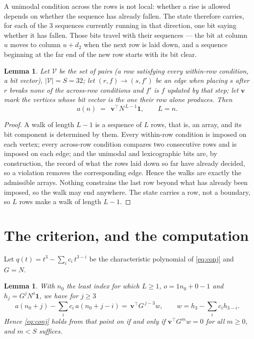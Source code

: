 \documentclass[11pt,a4paper]{article}
\theoremstyle{plain}
\newtheorem{lemma}[theorem]{Lemma}
\theoremstyle{definition}
\begin{document}
A unimodal condition across the rows is not local: whether a
rise is allowed depends on whether the sequence has already fallen. The state therefore
carries, for each of the $3$ sequences currently running in that direction, one bit saying
whether it has fallen. Those bits travel with their sequences --- the bit at column $u$
moves to column $u+d_2$ when the next row is laid down, and a sequence beginning at the
far end of the new row starts with its bit clear.

\begin{lemma}\label{lem:walk}
Let $\mathcal V$ be the set of pairs (a row satisfying every within-row condition, a
bit vector), $|\mathcal V|=S=32$; let $(r,f)\to(s,f')$ be an edge when placing $s$ after $r$
breaks none of the across-row conditions and $f'$ is $f$ updated by that step; let
$\mathbf{v}$ mark the vertices whose bit vector is the one their row alone produces.
Then
\[
a(n)\;=\;\,\mathbf{v}^{\!\top}N^{\,L-1}\mathbf{1},\qquad L=n.
\]
\end{lemma}

\begin{proof}
A walk of length $L-1$ is a sequence of $L$ rows, that is, an array, and its bit component
is determined by them. Every within-row condition is imposed on each vertex; every
across-row condition compares two consecutive rows and is imposed on each edge; and the
unimodal and lexicographic bits are, by construction, the record of what the rows laid down
so far have already decided, so a violation removes the corresponding edge. Hence the walks
are exactly the admissible arrays. Nothing constrains the last row beyond what has already
been imposed, so the walk may end anywhere. The state carries a row, not a boundary, so
$L$ rows make a walk of length $L-1$.
\end{proof}

\section{The criterion, and the computation}

Let $q(t)=t^{3}-\sum_i c_i\,t^{3-i}$ be the characteristic polynomial of
\eqref{eq:conj} and $G=N$.

\begin{lemma}\label{lem:crit}
With $n_0$ the least index for which $L\ge1$, $o=1n_0+0-1$ and
$h_j=G^{j}N^{o}\mathbf{1}$, we have for $j\ge3$
\[
a(n_0+j)-\sum_i c_i\,a(n_0+j-i)=\,\mathbf{v}^{\!\top}G^{\,j-3}w,
\qquad w=h_{3}-\sum_i c_ih_{3-i} .
\]
Hence \eqref{eq:conj} holds from that point on if and only if
$\mathbf{v}^{\!\top}G^{m}w=0$ for all $m\ge0$, and $m<S$ suffices.
\end{lemma}
\end{document}
